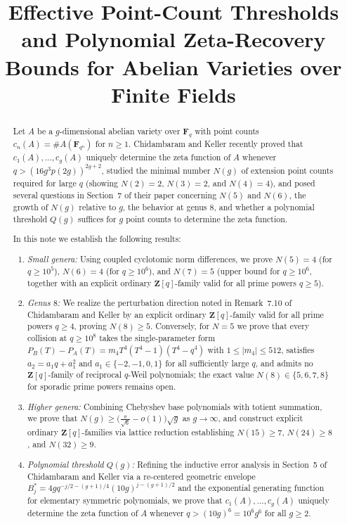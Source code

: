 \documentclass[11pt]{amsart}
\title[Effective Point-Count Thresholds and Polynomial Zeta-Recovery Bounds]{Effective Point-Count Thresholds and Polynomial Zeta-Recovery Bounds for Abelian Varieties over Finite Fields}
\date{}
\theoremstyle{remark}
\newcommand{\F}{\mathbf{F}}
\newcommand{\Z}{\mathbf{Z}}
\begin{document}
\begin{abstract}
Let $A$ be a $g$-dimensional abelian variety over $\F_q$ with point counts $c_n(A) = \#A(\F_{q^n})$ for $n \ge 1$. Chidambaram and Keller recently proved that $c_1(A), \dots, c_g(A)$ uniquely determine the zeta function of $A$ whenever $q > (16 g^3 p(2g))^{2g+2}$, studied the minimal number $N(g)$ of extension point counts required for large $q$ (showing $N(2) = 2$, $N(3) = 2$, and $N(4) = 4$), and posed several questions in Section~7 of their paper concerning $N(5)$ and $N(6)$, the growth of $N(g)$ relative to $g$, the behavior at genus $8$, and whether a polynomial threshold $Q(g)$ suffices for $g$ point counts to determine the zeta function.

In this note we establish the following results:
\begin{enumerate}
\item \emph{Small genera:} Using coupled cyclotomic norm differences, we prove $N(5) = 4$ (for $q \ge 10^5$), $N(6) = 4$ (for $q \ge 10^6$), and $N(7) = 5$ (upper bound for $q \ge 10^6$, together with an explicit ordinary $\Z[q]$-family valid for all prime powers $q \ge 5$).
\item \emph{Genus $8$:} We realize the perturbation direction noted in Remark~7.10 of Chidambaram and Keller by an explicit ordinary $\Z[q]$-family valid for all prime powers $q \ge 4$, proving $N(8) \ge 5$. Conversely, for $N = 5$ we prove that every collision at $q \ge 10^8$ takes the single-parameter form $P_B(T) - P_A(T) = m_4 T^4(T^4 - 1)(T^4 - q^4)$ with $1 \le |m_4| \le 512$, satisfies $a_2 = a_1 q + a_1^2$ and $a_1 \in \{-2, -1, 0, 1\}$ for all sufficiently large $q$, and admits no $\Z[q]$-family of reciprocal $q$-Weil polynomials; the exact value $N(8) \in \{5, 6, 7, 8\}$ for sporadic prime powers remains open.
\item \emph{Higher genera:} Combining Chebyshev base polynomials with totient summation, we prove that $N(g) \ge \bigl(\frac{\pi}{\sqrt{6}} - o(1)\bigr)\sqrt{g}$ as $g \to \infty$, and construct explicit ordinary $\Z[q]$-families via lattice reduction establishing $N(15) \ge 7$, $N(24) \ge 8$, and $N(32) \ge 9$.
\item \emph{Polynomial threshold $Q(g)$:} Refining the inductive error analysis in Section~5 of Chidambaram and Keller via a re-centered geometric envelope $B_j^* = 4 g q^{-j/2 - (g+1)/4} (10g)^{j - (g+1)/2}$ and the exponential generating function for elementary symmetric polynomials, we prove that $c_1(A), \dots, c_g(A)$ uniquely determine the zeta function of $A$ whenever $q > (10g)^6 = 10^6 g^6$ for all $g \ge 2$.
\end{enumerate}
\end{abstract}
\end{document}
